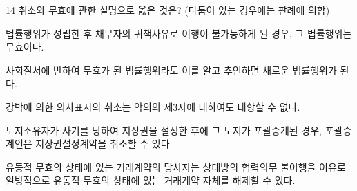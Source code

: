 \begin{question}{14}
취소와 무효에 관한 설명으로 옳은 것은? (다툼이 있는 경우에는 판례에 의함)
\begin{choices}
  \item 법률행위가 성립한 후 채무자의 귀책사유로 이행이 불가능하게 된 경우, 그 법률행위는 무효이다.
  \item 사회질서에 반하여 무효가 된 법률행위라도 이를 알고 추인하면 새로운 법률행위가 된다.
  \item 강박에 의한 의사표시의 취소는 악의의 제3자에 대하여도 대항할 수 없다.
  \item 토지소유자가 사기를 당하여 지상권을 설정한 후에 그 토지가 포괄승계된 경우, 포괄승계인은 지상권설정계약을 취소할 수 있다.
  \item 유동적 무효의 상태에 있는 거래계약의 당사자는 상대방의 협력의무 불이행을 이유로 일방적으로 유동적 무효의 상태에 있는 거래계약 자체를 해제할 수 있다.
\end{choices}
\end{question}
